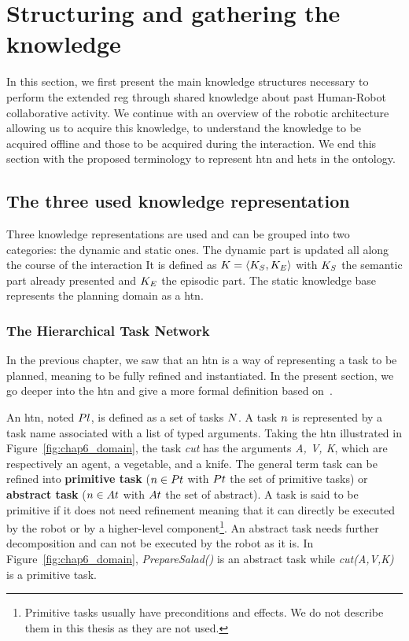 \section{Structuring and gathering the knowledge}

In this section, we first present the main knowledge structures necessary to perform the extended \acrshort{reg} through shared knowledge about past Human-Robot collaborative activity. We continue with an overview of the robotic architecture allowing us to acquire this knowledge, to understand the knowledge to be acquired offline and those to be acquired during the interaction. We end this section with the proposed terminology to represent \acrshort{htn} and \acrshort{het}s in the ontology.

\subsection{The three used knowledge representation}

Three knowledge representations are used and can be grouped into two categories: the dynamic and static ones. The dynamic part is updated all along the course of the interaction It is defined as $K = \langle K_S, K_E \rangle$ with $K_S$ the semantic part already presented and $K_E$ the episodic part. The static knowledge base represents the planning domain as a \acrfull{htn}.

\subsubsection{The Hierarchical Task Network}

In the previous chapter, we saw that an \acrshort{htn} is a way of representing a task to be planned, meaning to be fully refined and instantiated. In the present section, we go deeper into the \acrshort{htn} and give a more formal definition based on~\cite{erol_1994_htn}.

An \acrshort{htn}, noted $Pl$, is defined as a set of tasks $N$. A task $n$ is represented by a task name associated with a list of typed arguments. Taking the \acrshort{htn} illustrated in Figure~\ref{fig:chap6_domain}, the task \textit{cut} has the arguments \textit{A, V, K}, which are respectively an agent, a vegetable, and a knife. The general term task can be refined into \textbf{primitive task} ($n \in Pt$ with $Pt$ the set of primitive tasks) or \textbf{abstract task} ($n \in At$ with $At$ the set of abstract). A task is said to be primitive if it does not need refinement meaning that it can directly be executed by the robot or by a higher-level component\footnote{Primitive tasks usually have preconditions and effects. We do not describe them in this thesis as they are not used.}. An abstract task needs further decomposition and can not be executed by the robot as it is. In Figure~\ref{fig:chap6_domain}, \textit{PrepareSalad()} is an abstract task while \textit{cut(A,V,K)} is a primitive task.

